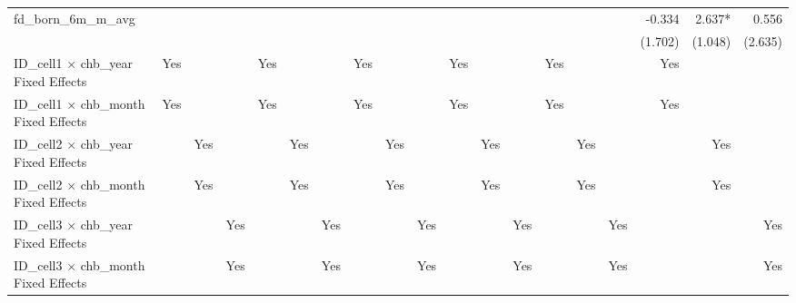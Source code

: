 \begin{tabular}{lrrrrrrrrrrrrrrrrrr}
fd\_born\_6m\_m\_avg                        &             &             &             &             &             &             &             &             &             &             &             &             &             &             &             &      -0.334 &      2.637* &       0.556 \\ 
                                            &             &             &             &             &             &             &             &             &             &             &             &             &             &             &             &     (1.702) &     (1.048) &     (2.635) \\ 
\midrule
ID\_cell1 $\times$ chb\_year Fixed Effects  &         Yes &             &             &         Yes &             &             &         Yes &             &             &         Yes &             &             &         Yes &             &             &         Yes &             &             \\ 
ID\_cell1 $\times$ chb\_month Fixed Effects &         Yes &             &             &         Yes &             &             &         Yes &             &             &         Yes &             &             &         Yes &             &             &         Yes &             &             \\ 
ID\_cell2 $\times$ chb\_year Fixed Effects  &             &         Yes &             &             &         Yes &             &             &         Yes &             &             &         Yes &             &             &         Yes &             &             &         Yes &             \\ 
ID\_cell2 $\times$ chb\_month Fixed Effects &             &         Yes &             &             &         Yes &             &             &         Yes &             &             &         Yes &             &             &         Yes &             &             &         Yes &             \\ 
ID\_cell3 $\times$ chb\_year Fixed Effects  &             &             &         Yes &             &             &         Yes &             &             &         Yes &             &             &         Yes &             &             &         Yes &             &             &         Yes \\ 
ID\_cell3 $\times$ chb\_month Fixed Effects &             &             &         Yes &             &             &         Yes &             &             &         Yes &             &             &         Yes &             &             &         Yes &             &             &         Yes \\ 

\end{tabular}
